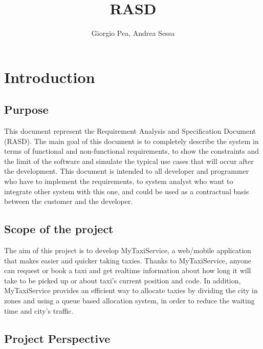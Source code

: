 \documentclass[11pt]{article} %
\title{RASD}
\author{Giorgio Pea, Andrea Sessa}
\begin{document}
\maketitle
\newpage

\tableofcontents

\newpage

\section{Introduction}
  \subsection{Purpose}
      This document represent the Requirement Analysis and Specification Document
    (RASD). The main goal of this document is to completely describe the system
    in terms of functional and non-functional requirements, to show the constraints and the limit
    of the software and simulate the typical use cases that will occur after the
    development. This document is intended to all developer and programmer who
    have to implement the requirements, to system analyst who want to integrate
    other system with this one, and could be used as a contractual basis between
    the customer and the developer.

  \subsection{Scope of the project}
   The aim of this project is to develop MyTaxiService, a web/mobile application that makes easier and quicker taking taxies.
    Thanks to MyTaxiService, anyone can request or book a taxi and get realtime information
    about how long it will take to be picked up or about taxi's current position and code.
    In addition, MyTaxiService provides an efficient way to allocate taxies by dividing the
    city in zones and using a queue based allocation system, in order to reduce the
    waiting time and city's traffic.
  \subsection{Project Perspective}
\end{document}
